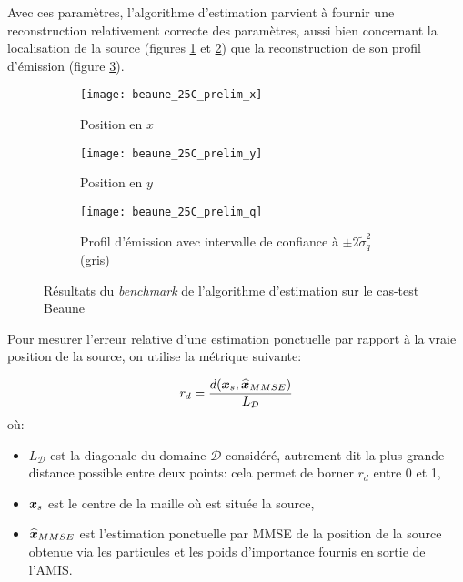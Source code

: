Avec ces paramètres, l'algorithme d'estimation parvient à fournir une reconstruction relativement correcte des paramètres, aussi bien concernant la localisation de la source (figures \ref{fig_25C_prelim_X} et \ref{fig_25C_prelim_Y}) que la reconstruction de son profil d'émission (figure \ref{fig_25C_prelim_Q}).\\

 \begin{figure}[h!]
 	\centering
 	\begin{subfigure}[t]{0.5\textwidth}
 		\centering
 		\texttt{[image: beaune\_25C\_prelim\_x]}
 		\caption{Position en $x$}
 		\label{fig_25C_prelim_X}
 	\end{subfigure}%
 	\begin{subfigure}[t]{0.5\textwidth}
 		\centering
 		\texttt{[image: beaune\_25C\_prelim\_y]}
 		\caption{Position en $y$}
 		\label{fig_25C_prelim_Y}
 	\end{subfigure}
 	\begin{subfigure}[t]{0.65\textwidth}
 		\centering
 		\texttt{[image: beaune\_25C\_prelim\_q]}
 		\caption{Profil d'émission avec intervalle de confiance à  $\pm 2 \widetilde{\sigma}_q^2$ (gris)}
 		\label{fig_25C_prelim_Q}
 	\end{subfigure} 
 	\caption{Résultats du \textit{benchmark} de l'algorithme d'estimation sur le cas-test Beaune}
 	\label{fig_25C_prelim}
 \end{figure}
 
 Pour mesurer l'erreur relative d'une estimation ponctuelle par rapport à la vraie position de la source, on utilise la métrique suivante:
 
 \begin{equation}
	 r_d = \dfrac{d({\bm{x}}_s,\widehat{{\bm{x}}}_{MMSE})}{L_{\mathcal{D}}}
 \end{equation}
 où:
 \begin{itemize}
 	\item $L_{\mathcal{D}}$ est la diagonale du domaine $\mathcal{D}$ considéré, autrement dit la plus grande distance possible entre deux points: cela permet de borner $r_d$ entre 0 et 1,
 	\item ${\bm{x}}_s$ est le centre de la maille où est située la source,
 	\item $\widehat{{\bm{x}}} _{MMSE}$ est l'estimation ponctuelle par MMSE de la position de la source obtenue via les particules et les poids d'importance fournis en sortie de l'AMIS.
 \end{itemize}
 

